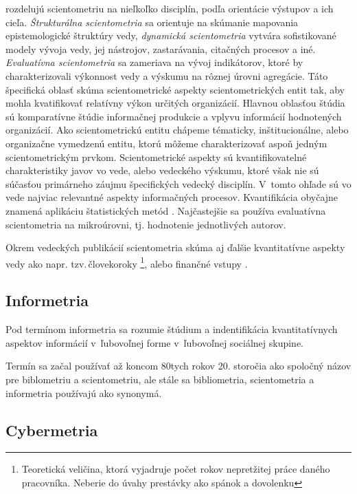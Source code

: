 \citet{Glanzel2004} rozdelujú scientometriu na nieľkoľko disciplín, podľa
orientácie výstupov a ich cieľa. \emph{Štrukturálna scientometria} sa orientuje
na skúmanie mapovania epistemologické štruktúry vedy, \emph{dynamická
scientometria} vytvára sofistikované modely vývoja vedy, jej nástrojov,
zastarávania, citačných procesov a iné. \emph{Evaluatívna scientometria} sa
zameriava na vývoj indikátorov, ktoré by charakterizovali výkonnost vedy a
výskumu na rôznej úrovni agregácie.  Táto špecifická oblasť skúma
scientometrické aspekty scientometrických entit tak, aby mohla kvatifikovať
relatívny výkon určitých organizácií. Hlavnou oblasťou štúdia sú komparatívne štúdie
informačnej produkcie a vplyvu informácií hodnotených organizácií. Ako
scientometrickú entitu chápeme tématicky, inštitucionálne, alebo organizačne
vymedzenú entitu, ktorú môžeme charakterizovať aspoň jedným scientometrickým
prvkom. Scientometrické aspekty sú kvantifikovatelné charakteristiky javov vo
vede, alebo vedeckého výskumu, ktoré však nie sú súčasťou primárneho záujmu
špecifických vedecký disciplín. V~tomto ohľade sú vo vede najviac relevantné
aspekty informačných procesov. Kvantifikácia obyčajne znamená aplikáciu
štatistických metód \citep{Vinkler2001}.  Najčastejšie sa používa evaluatívna
scientometria na mikroúrovni, tj. hodnotenie jednotlivých autorov.

Okrem vedeckých publikácií scientometria skúma aj ďalšie kvantitatívne aspekty
vedy ako napr. tzv.\,človekoroky \footnote{Teoretická veličina, ktorá vyjadruje
počet rokov nepretžitej práce daného pracovníka. Neberie do úvahy prestávky ako
spánok a dovolenku}, alebo finančné vstupy \citep{Bellis2009}.


\subsection{Informetria}

Pod termínom informetria sa rozumie štúdium a indentifikácia kvantitatívnych
aspektov informácií v~ľubovoľnej forme v~ľubovoľnej sociálnej skupine.

Termín sa začal používať až koncom 80tych rokov 20. storočia ako spoločný
názov pre biblometriu a scientometriu, ale stále sa bibliometria, scientometria a
informetria používajú ako synonymá.


\subsection{Cybermetria}

